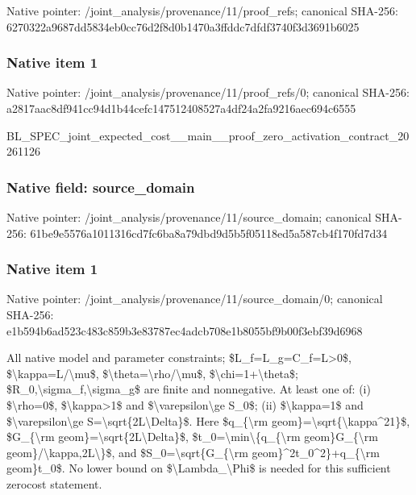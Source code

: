\documentclass[10pt,a4paper]{article}
\begin{document}
Native pointer: /joint\_analysis/provenan\allowbreak{}ce/11/proof\_refs; canonical SHA-256: 6270322a9687dd5834eb0cc7\allowbreak{}6d2f8d0b1470a3ffddc7dfdf\allowbreak{}3740f3d3691b6025



\subsubsection{Native item 1}


Native pointer: /joint\_analysis/provenan\allowbreak{}ce/11/proof\_refs/0; canonical SHA-256: a2817aac8df941cc94d1b44c\allowbreak{}efc147512408527a4df24a2f\allowbreak{}a9216aec694c6555


BL\_SPEC\_joint\_expected\_c\allowbreak{}ost\_\_main\_\_proof\_zero\_ac\allowbreak{}tivation\_contract\_202611\allowbreak{}26


\subsubsection{Native field: source\_domain}


Native pointer: /joint\_analysis/provenan\allowbreak{}ce/11/source\_domain; canonical SHA-256: 61be9e5576a1011316cd7fc6\allowbreak{}ba8a79dbd9d5b5f05118ed5a\allowbreak{}587cb4f170fd7d34



\subsubsection{Native item 1}


Native pointer: /joint\_analysis/provenan\allowbreak{}ce/11/source\_domain/0; canonical SHA-256: e1b594b6ad523c483c859b3e\allowbreak{}83787ec4adcb708e1b8055bf\allowbreak{}9b00f3ebf39d6968


All native model and parameter constraints; \$L\_f=L\_g=C\_f=L>0\$, \$\textbackslash{}kappa=L/\textbackslash{}mu\$, \$\textbackslash{}theta=\textbackslash{}rho/\textbackslash{}mu\$, \$\textbackslash{}chi=1+\textbackslash{}theta\$; \$R\_0,\textbackslash{}sigma\_f,\textbackslash{}sigma\_g\$ are finite and nonnegative. At least one of: (i) \$\textbackslash{}rho=0\$, \$\textbackslash{}kappa>1\$ and \$\textbackslash{}varepsilon\textbackslash{}ge S\_0\$; (ii) \$\textbackslash{}kappa=1\$ and \$\textbackslash{}varepsilon\textbackslash{}ge S=\textbackslash{}sqrt\{2L\textbackslash{}Delta\}\$. Here \$q\_\{\textbackslash{}rm geom\}=\textbackslash{}sqrt\{\textbackslash{}kappa\textasciicircum{}21\}\$, \$G\_\{\textbackslash{}rm geom\}=\textbackslash{}sqrt\{2L\textbackslash{}Delta\}\$, \$t\_0=\textbackslash{}min\textbackslash{}\{q\_\{\textbackslash{}rm geom\}G\_\{\textbackslash{}rm geom\}/\textbackslash{}kappa,2L\textbackslash{}\}\$, and \$S\_0=\textbackslash{}sqrt\{G\_\{\textbackslash{}rm geom\}\textasciicircum{}2t\_0\textasciicircum{}2\}+q\_\{\textbackslash{}rm geom\}t\_0\$. No lower bound on \$\textbackslash{}Lambda\_\textbackslash{}Phi\$ is needed for this sufficient zerocost statement.
\end{document}

